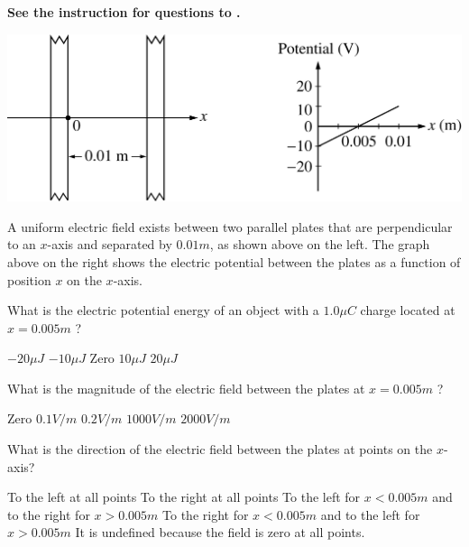 \textbf{See the instruction for questions  to .}

\begin{center}
\includegraphics[scale=0.2]{images/img-003-002.png}
\end{center}

A uniform electric field exists between two parallel plates that are perpendicular to an $x$-axis and separated by $0.01 \unit{m}$, as shown above on the left. The graph above on the right shows the electric potential between the plates as a function of position $x$ on the $x$-axis.

\begin{questions}\setcounter{question}{1}\question
What is the electric potential energy of an object with a $1.0 \unit{\mu C}$ charge located at $x=0.005 \unit{m}$ ?

\begin{oneparchoices}
\choice $-20 \unit{\mu J}$
\choice $-10 \unit{\mu J}$
\choice Zero
\choice $10 \unit{\mu J}$
\choice $20 \unit{\mu J}$
\end{oneparchoices}\end{questions}

\begin{questions}\setcounter{question}{2}\question
What is the magnitude of the electric field between the plates at $x=0.005 \unit{m}$ ?

\begin{oneparchoices}
\choice Zero
\choice $0.1 \unit{V / m}$
\choice $0.2 \unit{V / m}$
\choice $1000 \unit{V / m}$
\choice $2000 \unit{V / m}$
\end{oneparchoices}\end{questions}

\begin{questions}\setcounter{question}{3}\question
What is the direction of the electric field between the plates at points on the $x$-axis?

\begin{choices}
\choice To the left at all points
\choice To the right at all points
\choice To the left for $x<0.005 \unit{m}$ and to the right for $x>0.005 \unit{m}$
\choice To the right for $x<0.005 \unit{m}$ and to the left for $x>0.005 \unit{m}$
\choice It is undefined because the field is zero at all points.
\end{choices}\end{questions}

